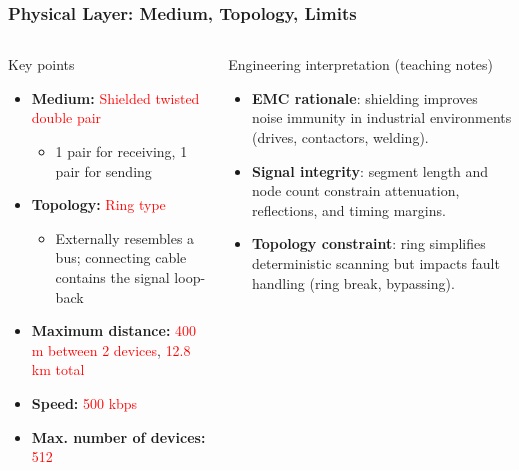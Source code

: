 \begin{frame}
	\frametitle{Physical Layer: Medium, Topology, Limits}
	\begin{columns}[T,onlytextwidth]
			\justifying
			\begin{block}{Key points}
				\begin{itemize}
					\item \textbf{Medium:} \textcolor{red}{Shielded twisted double pair}
					\begin{itemize}
						\item 1 pair for receiving, 1 pair for sending
					\end{itemize}
					\item \textbf{Topology:} \textcolor{red}{Ring type}
					\begin{itemize}
						\item Externally resembles a bus; connecting cable contains the signal loop-back
					\end{itemize}
					\item \textbf{Maximum distance:} \textcolor{red}{400 m between 2 devices}, \textcolor{red}{12.8 km total}
					\item \textbf{Speed:} \textcolor{red}{500 kbps}
					\item \textbf{Max. number of devices:} \textcolor{red}{512}
				\end{itemize}
			\end{block}
			\begin{block}{Engineering interpretation (teaching notes)}
				\begin{itemize}
					\item \textbf{EMC rationale}: shielding improves noise immunity in industrial environments (drives, contactors, welding).
					\item \textbf{Signal integrity}: segment length and node count constrain attenuation, reflections, and timing margins.
					\item \textbf{Topology constraint}: ring simplifies deterministic scanning but impacts fault handling (ring break, bypassing).
				\end{itemize}
			\end{block}
	\end{columns}
\end{frame}

